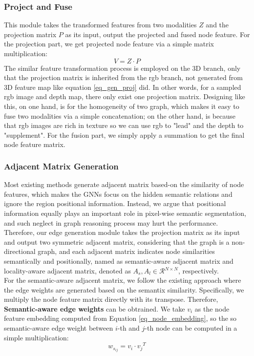 ﻿\documentclass[journal]{IEEEtran}
\begin{document}
\subsubsection{Project and Fuse}
       
    This module takes the transformed features from two modalities $Z$ and the projection matrix $P$ as its input, output the projected and fused node feature. For the projection part, we get projected node feature via a simple matrix multiplication:
    \begin{equation} 
        V = Z \cdot P
        \label{eq_node_embedding}
    \end{equation}
    The similar feature transformation process is employed on the 3D branch, only that the projection matrix is inherited from the rgb branch, not generated from 3D feature map like equation \ref{eq_gen_proj} did. In other words, for a sampled rgb image and depth map, there only exist one projection matrix. Designing like this, on one hand, is for the homogeneity of two graph, which makes it easy to fuse two modalities via a simple concatenation; on the other hand, is because that rgb images are rich in texture so we can use rgb to "lead" and the depth to "supplement". For the fusion part, we simply apply a summation to get the final node feature matrix. \\   

    
   
\subsubsection{Adjacent Matrix Generation}  \label{sec_sub_gen_edge} 
    Most existing methods generate adjacent matrix based-on the similarity of node features, which makes the GNNs focus on the hidden semantic relations and ignore the region positional information. Instead, we argue that positional information equally plays an important role in pixel-wise semantic segmentation, and such neglect in graph reasoning process may hurt the performance. Therefore, our edge generation module takes the projection matrix as its input and output two symmetric adjacent matrix, considering that the graph is a non-directional graph, and each adjacent matrix indicates node similarities semantically and positionally, named as semantic-aware adjacent matrix and locality-aware adjacent matrix, denoted as $A_s, A_l \in \mathcal{R}{^{N \times N}}$, respectively. \\

    For the semantic-aware adjacent matrix, we follow the existing approach where the edge weights are generated based on the semantix similarity. Specifically, we multiply the node feature matrix directly with its transpose. Therefore, \textbf{Semantic-aware edge weights} can be obtrained. We take $v_i$ as the node feature embedding computed from Equation \ref{eq_node_embedding}, so the so semantic-aware edge weight between $i$-th and $j$-th node can be computed in a simple multiplication:
    \begin{equation}\label{eq_adj_semantic}
        w_{s_{ij}} = v_i \cdot {v_j}^T
    \end{equation} \\
    
\end{document}
